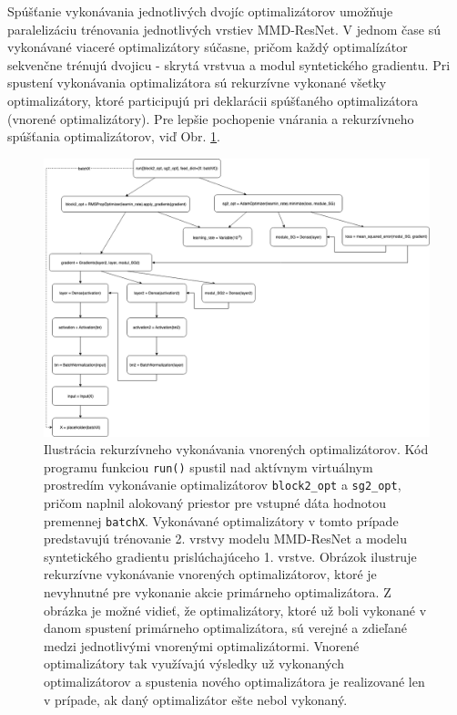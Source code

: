 Spúšťanie vykonávania jednotlivých dvojíc optimalizátorov umožňuje paralelizáciu trénovania jednotlivých vrstiev MMD-ResNet. V jednom čase sú vykonávané viaceré optimalizátory súčasne, pričom každý optimalízátor sekvenčne trénujú dvojicu - skrytá vrstvua a modul syntetického gradientu. Pri spustení vykonávania optimalizátora sú rekurzívne vykonané všetky optimalizátory, ktoré participujú pri deklarácii spúšťaného optimalizátora (vnorené optimalizátory). Pre lepšie pochopenie vnárania a rekurzívneho spúšťania optimalizátorov, viď Obr. \ref{rekurzivne}.

\begin{figure}
\centerline{\includegraphics[width=1.0\textwidth]{images/rekurzivne.png}}
\caption[Ilustrácia rekurzívneho vykonávania vnorených optimalizátorov]{Ilustrácia rekurzívneho vykonávania vnorených optimalizátorov. Kód programu funkciou \texttt{run()} spustil nad aktívnym virtuálnym prostredím vykonávanie optimalizátorov \texttt{block2_opt} a \texttt{sg2_opt}, pričom naplnil alokovaný priestor pre vstupné dáta hodnotou premennej \texttt{batchX}. Vykonávané optimalizátory v tomto prípade predstavujú trénovanie 2. vrstvy modelu MMD-ResNet a modelu syntetického gradientu prislúchajúceho 1. vrstve. Obrázok ilustruje rekurzívne vykonávanie vnorených optimalizátorov, ktoré je nevyhnutné pre vykonanie akcie primárneho optimalizátora. Z obrázka je možné vidieť, že optimalizátory, ktoré už boli vykonané v danom spustení primárneho optimalizátora, sú verejné a zdieľané medzi jednotlivými vnorenými optimalizátormi. Vnorené optimalizátory tak využívajú výsledky už vykonaných optimalizátorov a spustenia nového optimalizátora je realizované len v prípade, ak daný optimalizátor ešte nebol vykonaný.}
\label{rekurzivne}
\end{figure}

